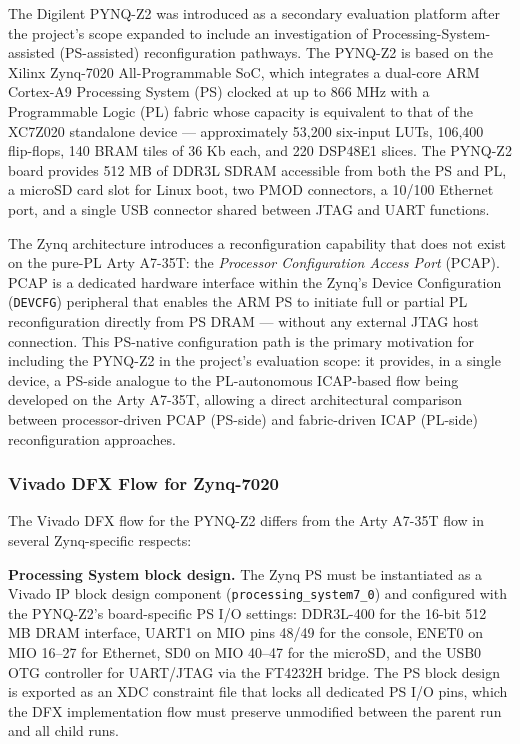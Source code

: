 The Digilent PYNQ-Z2 was introduced as a secondary evaluation platform after the project's scope expanded to include an investigation of Processing-System-assisted (PS-assisted) reconfiguration pathways. The PYNQ-Z2 is based on the Xilinx Zynq-7020 All-Programmable SoC, which integrates a dual-core ARM Cortex-A9 Processing System (PS) clocked at up to 866 MHz with a Programmable Logic (PL) fabric whose capacity is equivalent to that of the XC7Z020 standalone device — approximately 53,200 six-input LUTs, 106,400 flip-flops, 140 BRAM tiles of 36 Kb each, and 220 DSP48E1 slices. The PYNQ-Z2 board provides 512 MB of DDR3L SDRAM accessible from both the PS and PL, a microSD card slot for Linux boot, two PMOD connectors, a 10/100 Ethernet port, and a single USB connector shared between JTAG and UART functions.

The Zynq architecture introduces a reconfiguration capability that does not exist on the pure-PL Arty A7-35T: the \textit{Processor Configuration Access Port} (PCAP). PCAP is a dedicated hardware interface within the Zynq's Device Configuration (\texttt{DEVCFG}) peripheral that enables the ARM PS to initiate full or partial PL reconfiguration directly from PS DRAM — without any external JTAG host connection. This PS-native configuration path is the primary motivation for including the PYNQ-Z2 in the project's evaluation scope: it provides, in a single device, a PS-side analogue to the PL-autonomous ICAP-based flow being developed on the Arty A7-35T, allowing a direct architectural comparison between processor-driven PCAP (PS-side) and fabric-driven ICAP (PL-side) reconfiguration approaches.

\subsubsection{Vivado DFX Flow for Zynq-7020}

The Vivado DFX flow for the PYNQ-Z2 differs from the Arty A7-35T flow in several Zynq-specific respects:

\textbf{Processing System block design.} The Zynq PS must be instantiated as a Vivado IP block design component (\texttt{processing\_system7\_0}) and configured with the PYNQ-Z2's board-specific PS I/O settings: DDR3L-400 for the 16-bit 512 MB DRAM interface, UART1 on MIO pins 48/49 for the console, ENET0 on MIO 16–27 for Ethernet, SD0 on MIO 40–47 for the microSD, and the USB0 OTG controller for UART/JTAG via the FT4232H bridge. The PS block design is exported as an XDC constraint file that locks all dedicated PS I/O pins, which the DFX implementation flow must preserve unmodified between the parent run and all child runs.

